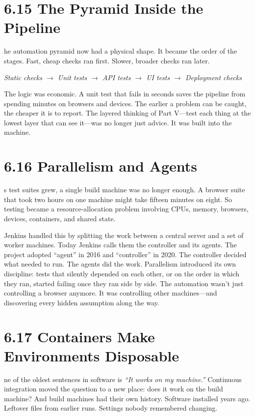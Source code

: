 \documentclass[11pt, a4paper, openany]{book}
\newcommand{\initialcap}[1]{{\fontfamily{lmss}\selectfont\huge\textbf{#1}}}
\begin{document}
\section{6.15 The Pyramid Inside the Pipeline}
\noindent \initialcap{T}he automation pyramid now had a physical shape. It became the order of the stages. Fast, cheap checks ran first. Slower, broader checks ran later.
\begin{center}
\textit{Static checks $\rightarrow$ Unit tests $\rightarrow$ API tests $\rightarrow$ UI tests $\rightarrow$ Deployment checks}
\end{center}
The logic was economic. A unit test that fails in seconds saves the pipeline from spending minutes on browsers and devices. The earlier a problem can be caught, the cheaper it is to report. The layered thinking of Part V---test each thing at the lowest layer that can see it---was no longer just advice. It was built into the machine.

\section{6.16 Parallelism and Agents}
\noindent \initialcap{A}s test suites grew, a single build machine was no longer enough. A browser suite that took two hours on one machine might take fifteen minutes on eight. So testing became a resource-allocation problem involving CPUs, memory, browsers, devices, containers, and shared state.

\noindent Jenkins handled this by splitting the work between a central server and a set of worker machines. Today Jenkins calls them the controller and its agents. The project adopted ``agent'' in 2016 and ``controller'' in 2020. The controller decided what needed to run. The agents did the work. Parallelism introduced its own discipline: tests that silently depended on each other, or on the order in which they ran, started failing once they ran side by side. The automation wasn't just controlling a browser anymore. It was controlling other machines---and discovering every hidden assumption along the way.

\section{6.17 Containers Make Environments Disposable}
\noindent \initialcap{O}ne of the oldest sentences in software is \textit{``It works on my machine.''} Continuous integration moved the question to a new place: does it work on the build machine? And build machines had their own history. Software installed years ago. Leftover files from earlier runs. Settings nobody remembered changing.
\end{document}

